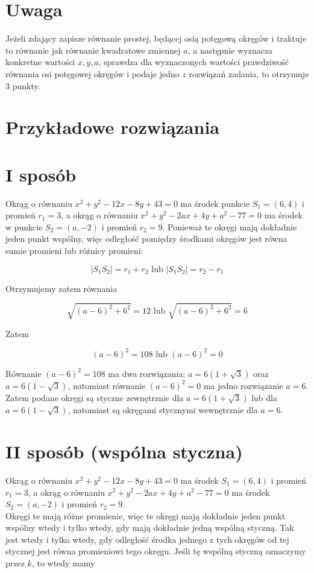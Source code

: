 \documentclass[10pt]{article}
\begin{document}
\section*{Uwaga}
Jeżeli zdający zapisze równanie prostej, będącej osią potęgową okręgów i traktuje to równanie jak równanie kwadratowe zmiennej $a$, a następnie wyznacza konkretne wartości $x, y, a$, sprawdza dla wyznaczonych wartości prawdziwość równania osi potęgowej okręgów i podaje jedno $z$ rozwiązań zadania, to otrzymuje 3 punkty.

\section*{Przykładowe rozwiązania}
\section*{I sposób}
Okrąg o równaniu $x^{2}+y^{2}-12 x-8 y+43=0$ ma środek punkcie $S_{1}=(6,4)$ i promień $r_{1}=3$, a okrąg o równaniu $x^{2}+y^{2}-2 a x+4 y+a^{2}-77=0$ ma środek w punkcie $S_{2}=(a,-2)$ i promień $r_{2}=9$. Ponieważ te okręgi mają dokładnie jeden punkt wspólny, więc odległość pomiędzy środkami okręgów jest równa sumie promieni lub różnicy promieni:

$$
\left|S_{1} S_{2}\right|=r_{1}+r_{2} \text { lub }\left|S_{1} S_{2}\right|=r_{2}-r_{1}
$$

Otrzymujemy zatem równania

$$
\sqrt{(a-6)^{2}+6^{2}}=12 \text { lub } \sqrt{(a-6)^{2}+6^{2}}=6
$$

Zatem

$$
(a-6)^{2}=108 \text { lub }(a-6)^{2}=0
$$

Równanie $(a-6)^{2}=108$ ma dwa rozwiązania: $a=6(1+\sqrt{3})$ oraz $a=6(1-\sqrt{3})$, natomiast równanie $(a-6)^{2}=0$ ma jedno rozwiązanie $a=6$. Zatem podane okręgi są styczne zewnętrznie dla $a=6(1+\sqrt{3})$ lub dla $a=6(1-\sqrt{3})$, natomiast są okręgami stycznymi wewnętrznie dla $a=6$.

\section*{II sposób (wspólna styczna)}
Okrąg o równaniu $x^{2}+y^{2}-12 x-8 y+43=0$ ma środek $S_{1}=(6,4)$ i promień $r_{1}=3$, a okrąg o równaniu $x^{2}+y^{2}-2 a x+4 y+a^{2}-77=0$ ma środek $S_{2}=(a,-2)$ i promień $r_{2}=9$.\\
Okręgi te mają różne promienie, więc te okręgi mają dokładnie jeden punkt wspólny wtedy i tylko wtedy, gdy mają dokładnie jedną wspólną styczną. Tak jest wtedy i tylko wtedy, gdy odległość środka jednego z tych okręgów od tej stycznej jest równa promieniowi tego okręgu. Jeśli tę wspólną styczną oznaczymy przez $k$, to wtedy mamy
\end{document}
